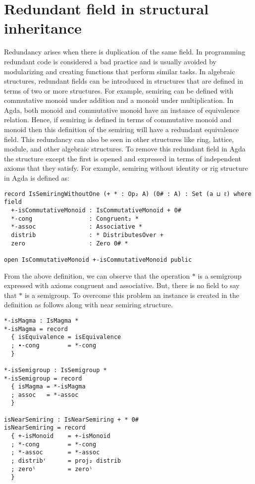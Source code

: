 \section{Redundant field in structural inheritance}
Redundancy arises when there is duplication of the same field. In programming
redundant code is considered a bad practice and is usually avoided by
modularizing and creating functions that perform similar tasks. In algebraic
structures, redundant fields can be introduced in structures that are defined in
terms of two or more structures. For example, semiring can be defined with
commutative monoid under addition and a monoid under multiplication. In Agda,
both monoid and commutative monoid have an instance of equivalence relation.
Hence, if semiring is defined in terms of commutative monoid and monoid then
this definition of the semiring will have a redundant equivalence field. This
redundancy can also be seen in other structures like ring, lattice, module, and
other algebraic structures. To remove this redundant field in Agda the structure
except the first is opened and expressed in terms of independent axioms that
they satisfy. For example, semiring without identity or rig structure in Agda is
defined as:

\begin{verbatim}
record IsSemiringWithoutOne (+ * : Op₂ A) (0# : A) : Set (a ⊔ ℓ) where
field
  +-isCommutativeMonoid : IsCommutativeMonoid + 0#
  *-cong                : Congruent₂ *
  *-assoc               : Associative *
  distrib               : * DistributesOver +
  zero                  : Zero 0# *

open IsCommutativeMonoid +-isCommutativeMonoid public
\end{verbatim}

From the above definition, we can observe that the operation $*$ is a semigroup
expressed with axioms congruent and associative. But, there is no field to
say that $*$ is a semigroup. To overcome this problem an instance is created in
the definition as follows along with near semiring structure.

\begin{verbatim}
*-isMagma : IsMagma *
*-isMagma = record
  { isEquivalence = isEquivalence
  ; ∙-cong        = *-cong
  }

*-isSemigroup : IsSemigroup *
*-isSemigroup = record
  { isMagma = *-isMagma
  ; assoc   = *-assoc
  }

isNearSemiring : IsNearSemiring + * 0#
isNearSemiring = record
  { +-isMonoid    = +-isMonoid
  ; *-cong        = *-cong
  ; *-assoc       = *-assoc
  ; distribʳ      = proj₂ distrib
  ; zeroˡ         = zeroˡ
  }
\end{verbatim}

